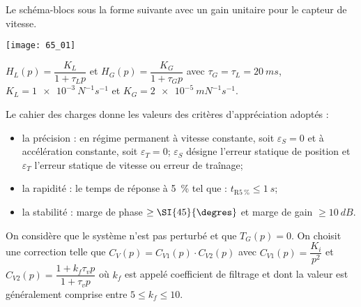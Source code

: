 \normaltrue \difficilefalse \tdifficilefalse
\correctionfalse

\setcounter{question}{0}


\ifcorrection
\else
{}
\fi
\ifprof
\else 

Le schéma-blocs sous la forme suivante avec un gain unitaire pour le capteur
de vitesse.

\begin{center}
\texttt{[image: 65\_01]}
\end{center}

$H_L(p)=\dfrac{K_L}{1+\tau_L p}$ et $H_G(p)=\dfrac{K_G}{1+\tau_G p}$  avec $\tau_G=\tau_L = \SI{20}{ms}$, $K_L = \SI{1e-3}{N^{-1}s^{-1}}$ et $K_G = \SI{2e-5}{mN^{-1}s^{-1}}$.


Le cahier des charges donne les valeurs des critères d'appréciation adoptés :
\begin{itemize}
\item la précision : en régime permanent à vitesse constante, soit $\varepsilon_S=0$ et à accélération constante, soit $\varepsilon_T=0$; $\varepsilon_S$ désigne l'erreur statique de position et $\varepsilon_T$ l'erreur statique de vitesse ou erreur de traînage;
\item la rapidité : le temps de réponse à \SI{5}{\%} tel que : $t_{\text{R}\SI{5}{\%}}\leq \SI{1}{s}$;
\item la stabilité : marge de phase $\geq \SI{45}{\degres}$ et marge de gain $\geq \SI{10}{dB}$.
\end{itemize}

On considère que le système n'est pas perturbé et que $T_G(p)=0$.
On choisit une correction telle que $C_{V}(p)= C_{V1}(p) \cdot C_{V2}(p) $ avec $C_{V1}(p)=\dfrac{K_i}{p^2}$ et $C_{V2}(p)=\dfrac{1+k_f \tau_v p }{1+\tau_v p }$ où $k_f$ est appelé coefficient de filtrage et dont la valeur est généralement comprise entre $5\leq k_f \leq 10$.
\fi

\ifprof
\else 
\fi


